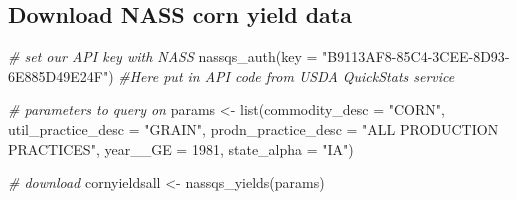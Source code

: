 \documentclass[
]{book}
\newenvironment{Shaded}{\begin{snugshade}}{\end{snugshade}}
\newcommand{\AttributeTok}[1]{\textcolor[rgb]{0.77,0.63,0.00}{#1}}
\newcommand{\CommentTok}[1]{\textcolor[rgb]{0.56,0.35,0.01}{\textit{#1}}}
\newcommand{\DecValTok}[1]{\textcolor[rgb]{0.00,0.00,0.81}{#1}}
\newcommand{\FunctionTok}[1]{\textcolor[rgb]{0.00,0.00,0.00}{#1}}
\newcommand{\NormalTok}[1]{#1}
\newcommand{\OtherTok}[1]{\textcolor[rgb]{0.56,0.35,0.01}{#1}}
\newcommand{\StringTok}[1]{\textcolor[rgb]{0.31,0.60,0.02}{#1}}
\begin{document}
\hypertarget{download-nass-corn-yield-data}{%
\subsection{Download NASS corn yield data}\label{download-nass-corn-yield-data}}

\begin{Shaded}
\begin{Highlighting}[]
\CommentTok{\# set our API key with NASS}
\FunctionTok{nassqs\_auth}\NormalTok{(}\AttributeTok{key =} \StringTok{"B9113AF8{-}85C4{-}3CEE{-}8D93{-}6E885D49E24F"}\NormalTok{) }\CommentTok{\#Here put in API code from USDA QuickStats service}

\CommentTok{\# parameters to query on }
\NormalTok{params }\OtherTok{\textless{}{-}} \FunctionTok{list}\NormalTok{(}\AttributeTok{commodity\_desc =} \StringTok{"CORN"}\NormalTok{, }\AttributeTok{util\_practice\_desc =} \StringTok{"GRAIN"}\NormalTok{, }\AttributeTok{prodn\_practice\_desc =} \StringTok{"ALL PRODUCTION PRACTICES"}\NormalTok{, }\AttributeTok{year\_\_GE =} \DecValTok{1981}\NormalTok{, }\AttributeTok{state\_alpha =} \StringTok{"IA"}\NormalTok{)}

\CommentTok{\# download}
\NormalTok{cornyieldsall }\OtherTok{\textless{}{-}} \FunctionTok{nassqs\_yields}\NormalTok{(params)}
\end{Highlighting}
\end{Shaded}
\end{document}
